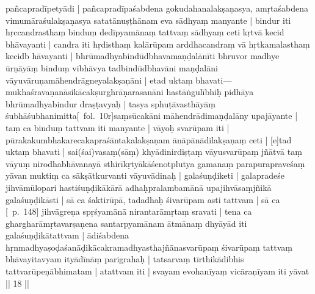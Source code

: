 \documentclass[12pt]{article}
\newcommand{\emdash} {\hspace{0em}—\hspace{0em}}
\begin{document}
pañcapradīpetyādi | pañcapradīpaśabdena gokudahanalakṣaṇasya, amṛtaśabdena vimumāraśulakṣaṇasya satatānuṣṭhānam eva sādhyaṃ manyante | bindur iti hṛccandrasthaṃ binduṃ dedīpyamānaṃ tattvaṃ sādhyaṃ ceti kṛtvā kecid bhāvayanti | candra iti hṛdisthaṃ kalārūpam arddhacandraṃ vā hṛtkamalasthaṃ kecidb hāvayanti | bhrūmadhyabindūdbhavamaṇḍalānīti bhruvor madhye ūrṇāyāṃ binduṃ vibhāvya tadbindūdbhavāni maṇḍalāni vāyuvāruṇamāhendrāgneyalakṣaṇāni | etad uktaṃ bhavati\emdash mukhaśravaṇanāsikācakṣurghrāṇarasanāni hastāṅgulībhiḥ pidhāya bhrūmadhyabindur draṣṭavyaḥ | tasya sphuṭāvasthāyāṃ śubhāśubhanimitta[\MS\ fol.\ 10r]saṃsūcakāni māhendrādimaṇḍalāny upajāyante | taṃ ca binduṃ tattvam iti manyante | vāyoḥ svarūpam iti | pūrakakumbhakarecakapraśāntakalakṣaṇam ānāpānādilakṣaṇaṃ ceti | [e]tad uktaṃ bhavati | sai(śai)vasaṃ(sāṃ) khyādinirdiṣṭaṃ vāyusvarūpaṃ jñātvā taṃ vāyuṃ nirodhabhāvanayā sthirīkṛtyākāśenotplutya gamanaṃ parapurapraveśaṃ yāvan muktiṃ ca sākṣātkurvanti vāyuvādinaḥ | galaśuṇḍiketi | galapradeśe jihvāmūlopari hastiśuṇḍikākārā adhaḥpralambamānā upajihvāsaṃjñikā galaśuṇḍikāsti | sā ca śaktirūpā, tadadhaḥ śivarūpam asti tattvam | sā ca [\EDD\ p.\ 148] jihvāgreṇa spṛśyamānā nirantarāmṛtaṃ sravati | tena ca ghargharāmṛtavarṣaṇena santarpyamānam ātmānaṃ dhyāyād iti galaśuṇḍikātattvam | ādiśabdena hṛnmadhyaṣoḍaśanāḍikācakramadhyasthajñānasvarūpaṃ śivarūpaṃ tattvaṃ bhāvayitavyam ityādīnāṃ parigrahaḥ | tatsarvaṃ tīrthikādibhis tattvarūpeṇābhimatam | atattvam iti | svayam evohanīyaṃ vicāraṇīyam iti yāvat || 18 ||\\
\end{document}
